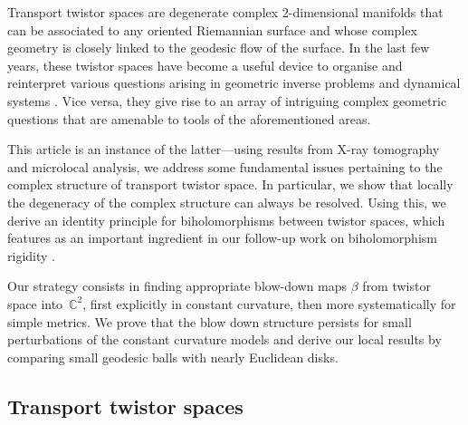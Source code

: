 \documentclass[pdftex]{sigma}
\numberwithin{equation}{section}
\theoremstyle{definition}
\newcommand{\C}{\mathbb{C}} %
\newcommand{\1}{{\bf 1}}
\begin{document}
Transport twistor spaces are degenerate complex $2$-dimensional manifolds that can be associated to any oriented Riemannian surface and whose complex geometry is closely linked to the geodesic flow of the surface.
In the last few years, these twistor spaces have become a useful device to organise and reinterpret various questions arising in geometric inverse problems and dynamical systems \cite{BLP24,BoPa23}.
Vice versa, they give rise to an array of intriguing complex geometric questions that are amenable to tools of the aforementioned areas.

This article is an instance of the latter---using results from X-ray tomography and microlocal analysis, we address some fundamental issues pertaining to the complex structure of transport twistor space. In particular, we
show that locally the degeneracy of the complex structure can always be resolved. Using this, we derive an identity principle for biholomorphisms between twistor spaces, which features as an important ingredient in our follow-up work on biholomorphism rigidity \cite{BMP24b}.

Our strategy consists in finding appropriate blow-down maps $\beta$ from twistor space into~$\C^2$, first explicitly in constant curvature, then more systematically for simple metrics. We prove that the blow down structure persists for small perturbations of the constant curvature models and derive our local results by comparing small geodesic balls with nearly Euclidean disks.


\subsection{Transport twistor spaces}
\end{document}
